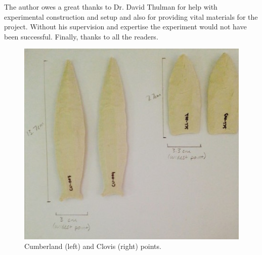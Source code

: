 \myseparator

The author owes a great thanks to Dr. David Thulman for help with experimental construction and setup and also for providing vital materials for the project. Without his supervision and expertise the experiment would not have been successful. Finally, thanks to all the readers.


\begin{figure}[!p]
	\includegraphics[width=\linewidth]{figures/gagglioli_Fig1}
	\centering
	\caption{Cumberland (left) and Clovis (right) points.}
	\label{fig:gagglioli_Fig1}
\end{figure}	

